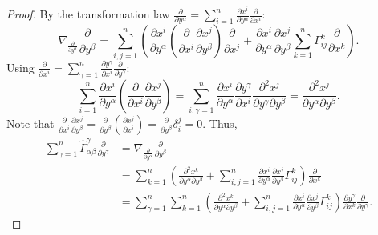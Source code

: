 \begin{proof}
By the transformation law $\frac{\partial}{\partial y^{\alpha}} = \sum_{i=1}^n \frac{\partial x^i}{\partial y^{\alpha}}\frac{\partial}{\partial x^i}$:
\[
\nabla_{\frac{\partial}{\partial y^{\alpha}}} \frac{\partial}{\partial y^{\beta}} = \sum_{i,j=1}^n \left( \frac{\partial x^i}{\partial y^{\alpha}} \left(\frac{\partial}{\partial x^i}\frac{\partial x^j}{\partial y^{\beta}}\right) \frac{\partial}{\partial x^j} + \frac{\partial x^i}{\partial y^{\alpha}}\frac{\partial x^j}{\partial y^{\beta}}\sum_{k=1}^n\Gamma_{ij}^k\frac{\partial}{\partial x^k}\right).
\]
Using $\frac{\partial}{\partial x^i} = \sum_{\gamma = 1}^n \frac{\partial y^{\gamma}}{\partial x^i}\frac{\partial}{\partial y^{\gamma}}$:
\[
\sum_{i=1}^n \frac{\partial x^i}{\partial y^{\alpha}}\left(\frac{\partial}{\partial x^i}\frac{\partial x^j}{\partial y^{\beta}}\right) = \sum_{i,\gamma=1}^n \frac{\partial x^i}{\partial y^{\alpha}}\frac{\partial y^{\gamma}}{\partial x^i}\frac{\partial^2x^j}{\partial y^{\gamma}\partial y^{\beta}} = \frac{\partial^2x^j}{\partial y^{\alpha}\partial y^{\beta}}.
\]
Note that $\frac{\partial}{\partial x^i}\frac{\partial x^j}{\partial y^{\beta}} = \frac{\partial}{\partial y^{\beta}}\left(\frac{\partial x^j}{\partial x^i}\right) = \frac{\partial}{\partial y^{\beta}}\delta_i^j = 0$.
Thus,
\[
\begin{aligned}
\sum_{\gamma = 1}^n \hat{\Gamma}_{\alpha\beta}^{\gamma}\frac{\partial}{\partial y^{\gamma}}
&= \nabla_{\frac{\partial}{\partial y^{\alpha}}} \frac{\partial}{\partial y^{\beta}} \\
&= \sum_{k=1}^n \left(\frac{\partial^2x^k}{\partial y^{\alpha}\partial y^{\beta}} + \sum_{i,j=1}^n \frac{\partial x^i}{\partial y^{\alpha}}\frac{\partial x^j}{\partial y^{\beta}}\Gamma_{ij}^k \right)\frac{\partial}{\partial x^k} \\
&= \sum_{\gamma=1}^n\sum_{k=1}^n \left(\frac{\partial^2x^k}{\partial y^{\alpha}\partial y^{\beta}} + \sum_{i,j=1}^n \frac{\partial x^i}{\partial y^{\alpha}}\frac{\partial x^j}{\partial y^{\beta}}\Gamma_{ij}^k \right)\frac{\partial y^{\gamma}}{\partial x^k}\frac{\partial}{\partial y^{\gamma}}.
\end{aligned}
\]
\end{proof}